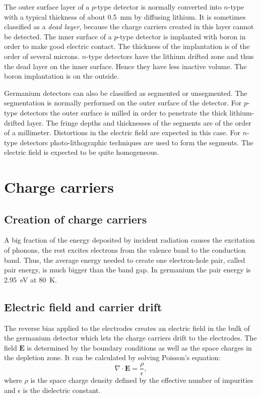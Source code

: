 The outer surface layer of a $p$-type detector is normally converted
into $n$-type with a typical thickness of about 0.5~mm by diffusing
lithium. It is sometimes classified as a \textit{dead layer}, because
the charge carriers created in this layer cannot be detected. The
inner surface of a $p$-type detector is implanted with boron in order
to make good electric contact. The thickness of the implantation is of
the order of several microns. $n$-type detectors have the lithium
drifted zone and thus the dead layer on the inner surface. Hence they
have less inactive volume. The boron implantation is on the outside.

Germanium detectors can also be classified as segmented or
unsegmented. The segmentation is normally performed on the outer
surface of the detector. For $p$-type detectors the outer surface is
milled in order to penetrate the thick lithium-drifted layer. The
fringe depths and thicknesses of the segments are of the order of a
millimeter. Distortions in the electric field are expected in this
case. For $n$-type detectors photo-lithographic techniques are used to
form the segments. The electric field is expected to be quite
homogeneous.

\section{Charge carriers}
\label{sec:det:drift}

\subsection{Creation of charge carriers}
\label{sec:det:exit}
A big fraction of the energy deposited by incident radiation causes
the excitation of phonons, the rest excites electrons from the valence
band to the conduction band. Thus, the average energy needed to create
one electron-hole pair, called pair energy, is much bigger than the
band gap. In germanium the pair energy is 2.95~eV at 80~K.

\subsection{Electric field and carrier drift}
\label{sec:det:field}
The reverse bias applied to the electrodes creates an electric field
in the bulk of the germanium detector which lets the charge carriers
drift to the electrodes. The field $\mathbf{E}$ is determined by the
boundary conditions as well as the space charges in the depletion
zone. It can be calculated by solving Poisson's equation:
\begin{equation} 
\label{eq:det:ef}
\nabla \cdot \mathbf{E} = \frac{\rho}{\epsilon},  
\end{equation}
where $\rho$ is the space charge density defined by the effective
number of impurities and $\epsilon$ is the dielectric constant.

